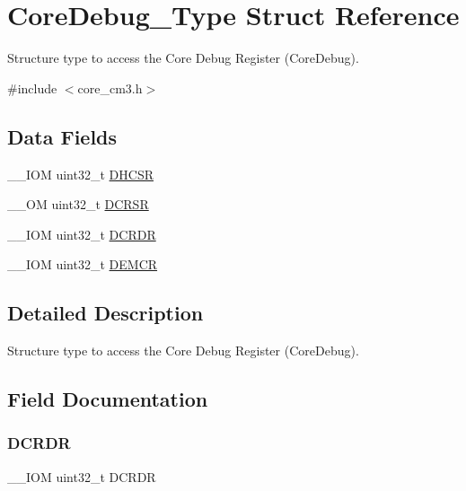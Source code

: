 \hypertarget{struct_core_debug___type}{}\section{Core\+Debug\+\_\+\+Type Struct Reference}
\label{struct_core_debug___type}


Structure type to access the Core Debug Register (Core\+Debug).  




{\ttfamily \#include $<$core\+\_\+cm3.\+h$>$}

\subsection*{Data Fields}
\begin{DoxyCompactItemize}
\item 
\+\_\+\+\_\+\+I\+OM uint32\+\_\+t \hyperlink{struct_core_debug___type_a94ca828091a9226ab6684fbf30e52909}{D\+H\+C\+SR}
\item 
\+\_\+\+\_\+\+OM uint32\+\_\+t \hyperlink{struct_core_debug___type_ab74a9ec90ad18e4f7a20362d362b754a}{D\+C\+R\+SR}
\item 
\+\_\+\+\_\+\+I\+OM uint32\+\_\+t \hyperlink{struct_core_debug___type_ad1dbd0dd98b6d9327f70545e0081ddbf}{D\+C\+R\+DR}
\item 
\+\_\+\+\_\+\+I\+OM uint32\+\_\+t \hyperlink{struct_core_debug___type_aa99de5f8c609f10c25ed51f57b2edd74}{D\+E\+M\+CR}
\end{DoxyCompactItemize}


\subsection{Detailed Description}
Structure type to access the Core Debug Register (Core\+Debug). 

\subsection{Field Documentation}
\mbox{\label{struct_core_debug___type_ad1dbd0dd98b6d9327f70545e0081ddbf}} 
\subsubsection{\texorpdfstring{D\+C\+R\+DR}{DCRDR}}
{\footnotesize\ttfamily \+\_\+\+\_\+\+I\+OM uint32\+\_\+t D\+C\+R\+DR}

